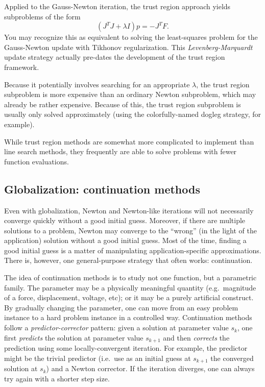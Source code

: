 \documentclass[12pt, leqno]{article}
\begin{document}
Applied to the Gauss-Newton iteration, the trust region approach
yields subproblems of the form
\[
  (J^T J + \lambda I) p = -J^T F.
\]
You may recognize this as equivalent to solving the least-squares
problem for the Gauss-Newton update with Tikhonov regularization.
This {\em Levenberg-Marquardt} update strategy actually pre-dates the
development of the trust region framework.

Because it potentially involves searching for an appropriate
$\lambda$, the trust region subproblem is more expensive than an
ordinary Newton subproblem, which may already be rather expensive.
Because of this, the trust region subproblem is usually only solved
approximately (using the colorfully-named dogleg strategy, for
example).

While trust region methods are somewhat more complicated to implement
than line search methods, they frequently are able to solve problems
with fewer function evaluations.

\subsection{Globalization: continuation methods}

Even with globalization, Newton and Newton-like iterations will not
necessarily converge quickly without a good initial guess.  Moreover,
if there are multiple solutions to a problem, Newton may converge to
the ``wrong'' (in the light of the application) solution without a
good initial guess.  Most of the time, finding a good initial guess is
a matter of manipulating application-specific approximations.
There is, however, one general-purpose strategy that often works:
continuation.

The idea of continuation methods is to study not one function, but a
parametric family.  The parameter may be a physically meaningful
quantity (e.g.~magnitude of a force, displacement, voltage, etc); or
it may be a purely artificial construct.  By gradually changing the
parameter, one can move from an easy problem instance to a hard
problem instance in a controlled way.  Continuation methods follow a
{\em predictor-corrector} pattern: given a solution at parameter value
$s_k$, one first {\em predicts} the solution at parameter value
$s_{k+1}$ and then {\em corrects} the prediction using some
locally-convergent iteration.  For example, the predictor might be the
trivial predictor (i.e.~use as an initial guess at $s_{k+1}$ the
converged solution at $s_k$) and a Newton corrector.  If the iteration
diverges, one can always try again with a shorter step size.
\end{document}
